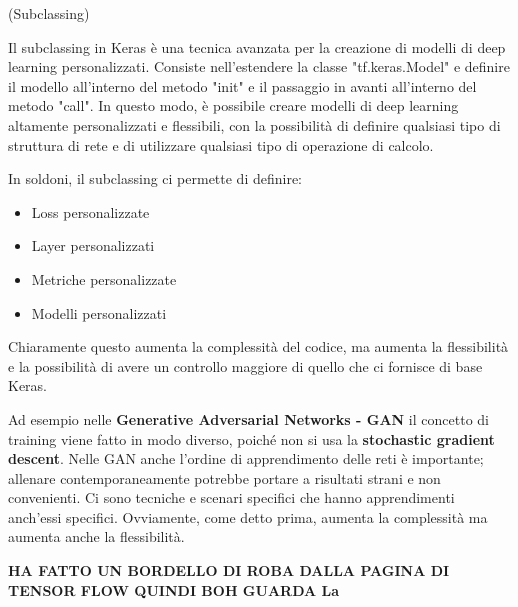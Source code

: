 \begin{definition}(Subclassing)
\end{definition}

Il subclassing in Keras è una tecnica avanzata per la creazione di modelli di
deep learning personalizzati. Consiste nell'estendere la classe
"tf.keras.Model" e definire il modello all'interno del metodo "init" e il
passaggio in avanti all'interno del metodo "call". In questo modo, è possibile
creare modelli di deep learning altamente personalizzati e flessibili, con la
possibilità di definire qualsiasi tipo di struttura di rete e di utilizzare
qualsiasi tipo di operazione di calcolo.

In soldoni, il subclassing ci permette di definire:
\begin{itemize}
    \item Loss personalizzate
    \item Layer personalizzati
    \item Metriche personalizzate
    \item Modelli personalizzati
\end{itemize}

Chiaramente questo aumenta la complessità del codice, ma aumenta la
flessibilità e la possibilità di avere un controllo maggiore di quello che ci
fornisce di base Keras.

Ad esempio nelle \textbf{Generative Adversarial Networks - GAN} il concetto di
training viene fatto in modo diverso, poiché non si usa la \textbf{stochastic
    gradient descent}. Nelle GAN anche l'ordine di apprendimento delle reti è
importante; allenare contemporaneamente potrebbe portare a risultati strani e
non convenienti. Ci sono tecniche e scenari specifici che hanno apprendimenti
anch'essi specifici. Ovviamente, come detto prima, aumenta la complessità ma
aumenta anche la flessibilità.


\textbf{HA FATTO UN BORDELLO DI ROBA DALLA PAGINA DI TENSOR FLOW QUINDI BOH GUARDA La}


\newpage

